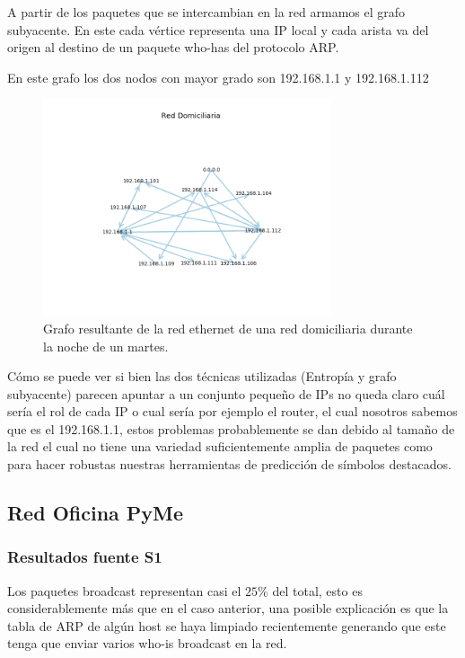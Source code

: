A partir de los paquetes que se intercambian en la red armamos el grafo subyacente. En este cada vértice representa una IP local y cada arista va del origen al destino de un paquete who-has del protocolo ARP.

En este grafo los dos nodos con mayor grado son 192.168.1.1 y 192.168.1.112

\begin{figure}[H]
\centering
	\includegraphics[width=8.5cm]{figs/grafo_red_domiciliaria.png}
	\caption{Grafo resultante de la red ethernet de una red domiciliaria durante la noche de un martes.}
	\label{fig:hogar-grafo}
\end{figure}

Cómo se puede ver si bien las dos técnicas utilizadas (Entropía y grafo subyacente) parecen apuntar a un conjunto pequeño de IPs no queda claro cuál sería el rol de cada IP o cual sería por ejemplo el router, el cual nosotros sabemos que es el 192.168.1.1, estos problemas probablemente se dan debido al tamaño de la red el cual no tiene una variedad suficientemente amplia de paquetes como para hacer robustas nuestras herramientas de predicción de símbolos destacados.

\subsection*{Red Oficina PyMe}
\subsubsection*{Resultados fuente S1}

Los paquetes broadcast representan casi el $25\%$ del total, esto es considerablemente más que en el caso anterior, una posible explicación es que la tabla de ARP de algún host se haya limpiado recientemente generando que este tenga que enviar varios who-is broadcast en la red.

